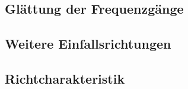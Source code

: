 \subsection{Glättung der Frequenzgänge}

\subsection{Weitere Einfallsrichtungen}

\subsection{Richtcharakteristik}